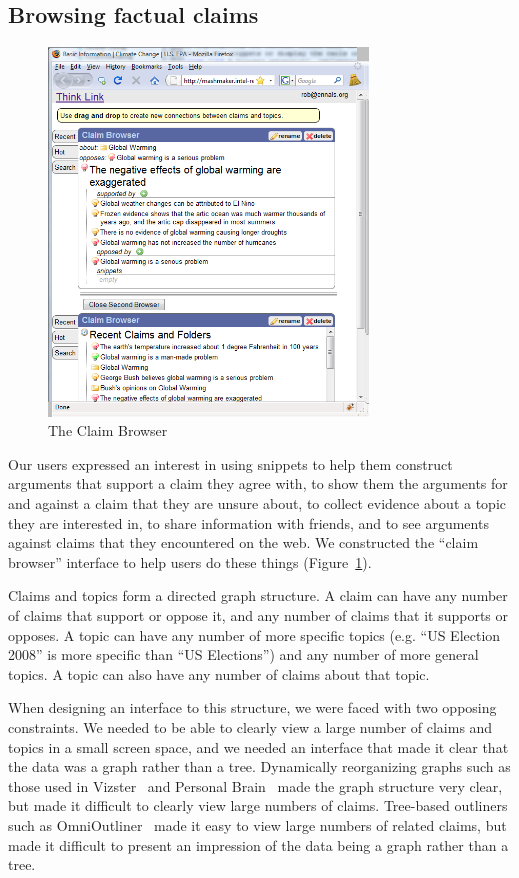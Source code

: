 \documentclass{chi2009}
\newcommand{\todo}[1]{}
\begin{document}
\todo{Make new snippet icon throb when something is selected}

\subsection{Browsing factual claims}
\label{browseclaim}

\begin{figure}[ht]
	\includegraphics[width=8.5cm]{../screenshots/claimbrowse.png}
	\caption{The Claim Browser}
	\label{fig:claimbrowser}
\end{figure}

Our users expressed an interest in using snippets to help them construct arguments that support a claim they agree with, to show them the arguments for and against a claim that they are unsure about, to collect evidence about a topic they are interested in, to share information with friends, and to see arguments against claims that they encountered on the web. We constructed the ``claim browser'' interface to help users do these things (Figure~\ref{fig:claimbrowser}).

Claims and topics form a directed graph structure. A claim can have any number of claims that support or oppose it, and any number of claims that it supports or opposes.
A topic can have any number of more specific topics (e.g. ``US Election 2008'' is more specific than ``US Elections'') and any number of more general topics. A topic can also have any number of claims about that topic.

When designing an interface to this structure, we were faced with two opposing constraints. We needed to be able to clearly view a large number of claims and topics in a small screen space, and we needed an interface that made it clear that the data was a graph rather than a tree. Dynamically reorganizing graphs such as those used in Vizster~\cite{vizster} and Personal Brain~\cite{thebrain} made the graph structure very clear, but made it difficult to clearly view large numbers of claims. Tree-based outliners such as OmniOutliner~\cite{outliner} made it easy to view large numbers of related claims, but made it difficult to present an impression of the data being a graph rather than a tree.
\end{document}
